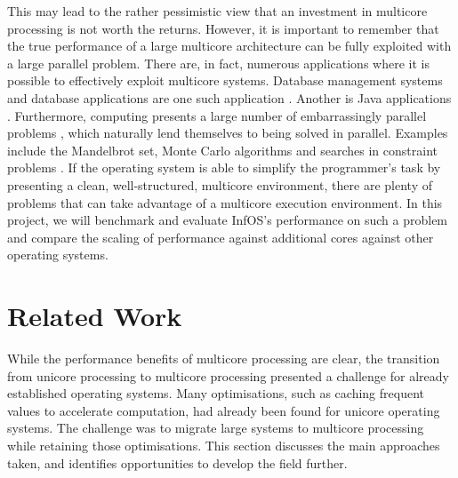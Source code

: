 \documentclass[bsc,frontabs,twoside,singlespacing,parskip,deptreport]{infthesis}     %
\begin{document}
This may lead to the rather pessimistic view that an investment in multicore processing is not worth the returns. However, it is important to remember that the true performance of a large multicore architecture can be fully exploited with a large parallel problem. There are, in fact, numerous applications where it is possible to effectively exploit multicore systems. Database management systems and database applications are one such application \cite{DBLP:journals/queue/McDougall05}. Another is Java applications \cite{DBLP:journals/usenix-login/McDougallL06}. Furthermore, computing presents a large number of embarrassingly parallel problems \cite{DBLP:books/daglib/0020056}, which naturally lend themselves to being solved in parallel. Examples include the Mandelbrot set, Monte Carlo algorithms \cite{DBLP:conf/uai/NeiswangerWX14} and searches in constraint problems \cite{DBLP:journals/jair/MalapertRR16}. If the operating system is able to simplify the programmer's task by presenting a clean, well-structured, multicore environment, there are plenty of problems that can take advantage of a multicore execution environment. In this project, we will benchmark and evaluate InfOS’s performance on such a problem and compare the scaling of performance against additional cores against other operating systems.




\section{Related Work} \label{related-work}
While the performance benefits of multicore processing are clear, the transition from unicore processing to multicore processing presented a challenge for already established operating systems. Many optimisations, such as caching frequent values to accelerate computation, had already been found for unicore operating systems. The challenge was to migrate large systems to multicore processing while retaining those optimisations. This section discusses the main approaches taken, and identifies opportunities to develop the field further.
\end{document}
